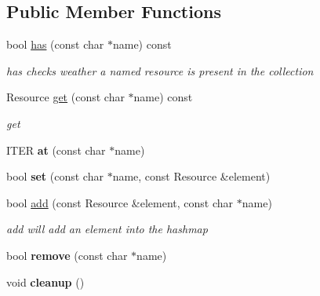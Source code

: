 \subsection*{Public Member Functions}
\begin{DoxyCompactItemize}
\item 
bool \hyperlink{classps_1_1FastAccessNamedResource_ac781dbc4f970d458bf8bfc5ef9896df6}{has} (const char $\ast$name) const 
\begin{DoxyCompactList}\small\item\em has checks weather a named resource is present in the collection \end{DoxyCompactList}\item 
Resource \hyperlink{classps_1_1FastAccessNamedResource_a10068de137ce1cada217b3e99992a431}{get} (const char $\ast$name) const 
\begin{DoxyCompactList}\small\item\em get \end{DoxyCompactList}\item 
\hypertarget{classps_1_1FastAccessNamedResource_a25f0d1aab3afa15fce7fe59d8c732b97}{}I\+T\+E\+R {\bfseries at} (const char $\ast$name)\label{classps_1_1FastAccessNamedResource_a25f0d1aab3afa15fce7fe59d8c732b97}

\item 
\hypertarget{classps_1_1FastAccessNamedResource_aba96d2a7d5ce1b8c1d6249712066c095}{}bool {\bfseries set} (const char $\ast$name, const Resource \&element)\label{classps_1_1FastAccessNamedResource_aba96d2a7d5ce1b8c1d6249712066c095}

\item 
bool \hyperlink{classps_1_1FastAccessNamedResource_a768ce90516cc7ed73f4f439cbccbc4ea}{add} (const Resource \&element, const char $\ast$name)
\begin{DoxyCompactList}\small\item\em add will add an element into the hashmap \end{DoxyCompactList}\item 
\hypertarget{classps_1_1FastAccessNamedResource_a3f5f275abd2f7ef8e90d4bd84965239c}{}bool {\bfseries remove} (const char $\ast$name)\label{classps_1_1FastAccessNamedResource_a3f5f275abd2f7ef8e90d4bd84965239c}

\item 
\hypertarget{classps_1_1FastAccessNamedResource_a0998b26ab4c2d1a25cc18c6791fc0c82}{}void {\bfseries cleanup} ()\label{classps_1_1FastAccessNamedResource_a0998b26ab4c2d1a25cc18c6791fc0c82}


\end{DoxyCompactItemize}
